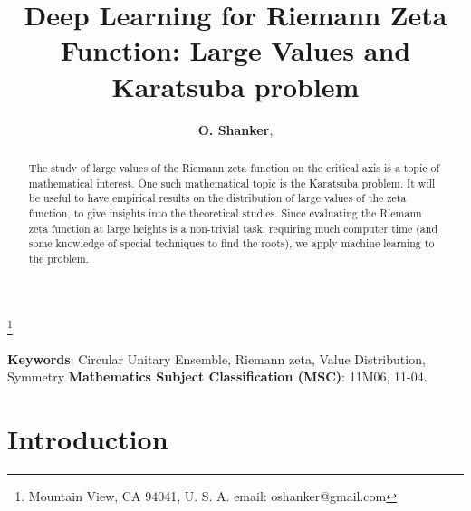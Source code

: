 \documentclass[twoside]{article}
\begin{document}


\newtheorem{theorem}{Theorem}[section]
\newtheorem{lemma}[theorem]{Lemma}

\theoremstyle{definition}
\newtheorem{definition}[theorem]{Definition}
\newtheorem{example}[theorem]{Example}
\newtheorem{xca}[theorem]{Exercise}

\theoremstyle{remark}
\newtheorem{remark}[theorem]{Remark}



\date{}
\lhead[]{}
\rhead[]{}

\title{\bf{Deep Learning for Riemann Zeta Function: Large Values and Karatsuba problem}}

\maketitle


\author{{\textbf{O. Shanker}},}
\thanks{ Mountain View, CA 94041, U. S. A. email: oshanker@gmail.com}

\thispagestyle{fancy}

\begin{abstract}
The study of large values of the Riemann zeta function on the critical axis is a topic of mathematical
interest.  One such mathematical topic is the Karatsuba problem. It will be useful to have empirical results on the distribution of large values of the zeta function, to give insights 
into the theoretical studies.  Since evaluating the Riemann zeta function at large heights  is a non-trivial task, requiring much computer time 
(and some knowledge of special techniques to find the roots), we apply
machine learning to the problem.

\end{abstract}
{\textbf {Keywords}:} Circular Unitary Ensemble, Riemann zeta, Value Distribution, Symmetry 
{\textbf {Mathematics Subject Classification (MSC)}:} 11M06, 11-04.


\symbolfootnote[0]{*}


\section{Introduction}
\end{document}
